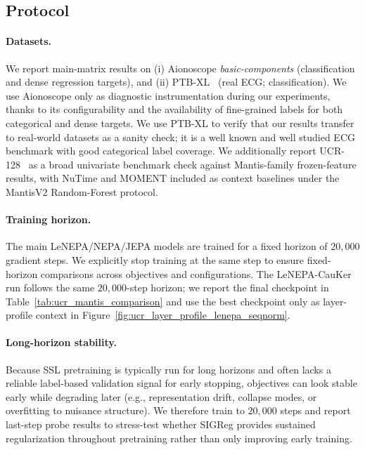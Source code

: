 \subsection{Protocol}
\label{sec:appendix_experiments_protocol}

\paragraph{Datasets.}
We report main-matrix results on (i) Aionoscope \emph{basic-components} (classification and dense regression targets), and (ii) PTB-XL~\citep{wagner2020ptbxl} (real ECG; classification).
We use Aionoscope only as diagnostic instrumentation during our experiments, thanks to its configurability and the availability of fine-grained labels for both categorical and dense targets.
We use PTB-XL to verify that our results transfer to real-world datasets as a sanity check; it is a well known and well studied ECG benchmark with good categorical label coverage.
We additionally report UCR-128~\citep{dau2019ucr} as a broad univariate benchmark check against Mantis-family frozen-feature results, with NuTime and MOMENT included as context baselines under the MantisV2 Random-Forest protocol.

\paragraph{Training horizon.}
The main LeNEPA/NEPA/JEPA models are trained for a fixed horizon of $20{,}000$ gradient steps.
We explicitly stop training at the same step to ensure fixed-horizon comparisons across objectives and configurations.
The LeNEPA-CauKer run follows the same $20{,}000$-step horizon; we report the final checkpoint in Table~\ref{tab:ucr_mantis_comparison} and use the best checkpoint only as layer-profile context in Figure~\ref{fig:ucr_layer_profile_lenepa_seqnorm}.

\paragraph{Long-horizon stability.}
Because SSL pretraining is typically run for long horizons and often lacks a reliable label-based validation signal for early stopping, objectives can look stable early while degrading later (e.g., representation drift, collapse modes, or overfitting to nuisance structure).
We therefore train to $20{,}000$ steps and report last-step probe results to stress-test whether SIGReg provides sustained regularization throughout pretraining rather than only improving early training.

